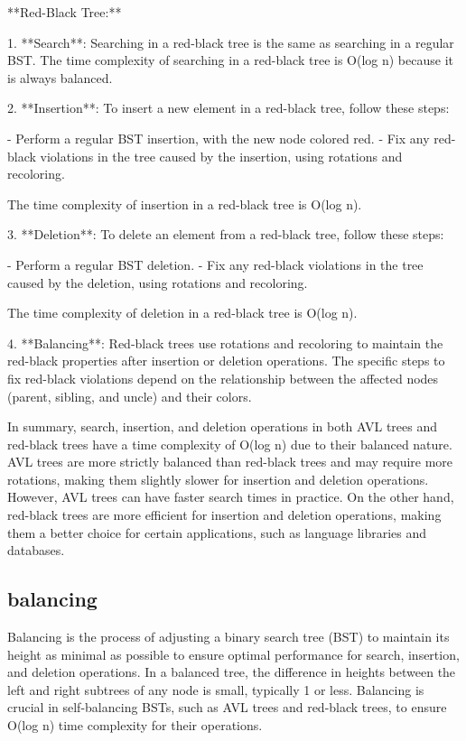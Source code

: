 \documentclass{article}
\begin{document}
**Red-Black Tree:**

1. **Search**: Searching in a red-black tree is the same as searching in a regular BST. The time complexity of searching in a red-black tree is O(log n) because it is always balanced.

2. **Insertion**: To insert a new element in a red-black tree, follow these steps:

   - Perform a regular BST insertion, with the new node colored red.
   - Fix any red-black violations in the tree caused by the insertion, using rotations and recoloring.

   The time complexity of insertion in a red-black tree is O(log n).

3. **Deletion**: To delete an element from a red-black tree, follow these steps:

   - Perform a regular BST deletion.
   - Fix any red-black violations in the tree caused by the deletion, using rotations and recoloring.

   The time complexity of deletion in a red-black tree is O(log n).

4. **Balancing**: Red-black trees use rotations and recoloring to maintain the red-black properties after insertion or deletion operations. The specific steps to fix red-black violations depend on the relationship between the affected nodes (parent, sibling, and uncle) and their colors.

In summary, search, insertion, and deletion operations in both AVL trees and red-black trees have a time complexity of O(log n) due to their balanced nature. AVL trees are more strictly balanced than red-black trees and may require more rotations, making them slightly slower for insertion and deletion operations. However, AVL trees can have faster search times in practice. On the other hand, red-black trees are more efficient for insertion and deletion operations, making them a better choice for certain applications, such as language libraries and databases.


\subsection{balancing}

Balancing is the process of adjusting a binary search tree (BST) to maintain its height as minimal as possible to ensure optimal performance for search, insertion, and deletion operations. In a balanced tree, the difference in heights between the left and right subtrees of any node is small, typically 1 or less. Balancing is crucial in self-balancing BSTs, such as AVL trees and red-black trees, to ensure O(log n) time complexity for their operations.
\end{document}
